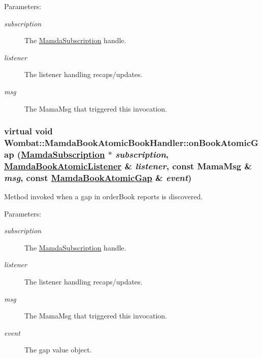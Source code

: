 \begin{Desc}
\item[Parameters:]
\begin{description}
\item[{\em subscription}]The \hyperlink{classWombat_1_1MamdaSubscription}{Mamda\-Subscription} handle. \item[{\em listener}]The listener handling recaps/updates. \item[{\em msg}]The Mama\-Msg that triggered this invocation. \end{description}
\end{Desc}
\hypertarget{classWombat_1_1MamdaBookAtomicBookHandler_cbcf3035872b8a2c22bc61adf2e4e491}{
\subsubsection[onBookAtomicGap]{\setlength{\rightskip}{0pt plus 5cm}virtual void Wombat::Mamda\-Book\-Atomic\-Book\-Handler::on\-Book\-Atomic\-Gap (\hyperlink{classWombat_1_1MamdaSubscription}{Mamda\-Subscription} $\ast$ {\em subscription}, \hyperlink{classWombat_1_1MamdaBookAtomicListener}{Mamda\-Book\-Atomic\-Listener} \& {\em listener}, const Mama\-Msg \& {\em msg}, const \hyperlink{classWombat_1_1MamdaBookAtomicGap}{Mamda\-Book\-Atomic\-Gap} \& {\em event})}}
\label{classWombat_1_1MamdaBookAtomicBookHandler_cbcf3035872b8a2c22bc61adf2e4e491}


Method invoked when a gap in order\-Book reports is discovered. 

\begin{Desc}
\item[Parameters:]
\begin{description}
\item[{\em subscription}]The \hyperlink{classWombat_1_1MamdaSubscription}{Mamda\-Subscription} handle. \item[{\em listener}]The listener handling recaps/updates. \item[{\em msg}]The Mama\-Msg that triggered this invocation. \item[{\em event}]The gap value object. \end{description}
\end{Desc}
